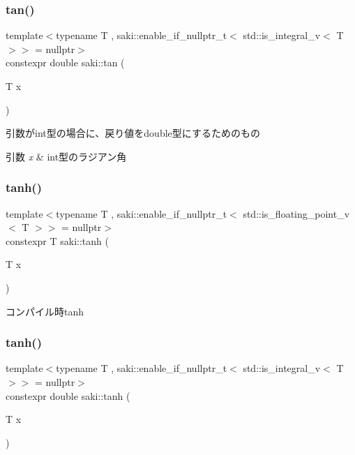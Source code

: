 \subsubsection{\texorpdfstring{tan()}{tan()}\hspace{0.1cm}{\footnotesize\ttfamily [2/2]}}
{\footnotesize\ttfamily template$<$typename T , saki\+::enable\+\_\+if\+\_\+nullptr\+\_\+t$<$ std\+::is\+\_\+integral\+\_\+v$<$ T $>$$>$  = nullptr$>$ \\
constexpr double saki\+::tan (\begin{DoxyParamCaption}\item[{T}]{x }\end{DoxyParamCaption})}



引数がint型の場合に、戻り値をdouble型にするためのもの 


\begin{DoxyParams}{引数}
{\em x} & int型のラジアン角 \\
\hline
\end{DoxyParams}
\mbox{\label{namespacesaki_af2674216630169ce211f8076492ce14e}} 
\subsubsection{\texorpdfstring{tanh()}{tanh()}\hspace{0.1cm}{\footnotesize\ttfamily [1/2]}}
{\footnotesize\ttfamily template$<$typename T , saki\+::enable\+\_\+if\+\_\+nullptr\+\_\+t$<$ std\+::is\+\_\+floating\+\_\+point\+\_\+v$<$ T $>$$>$  = nullptr$>$ \\
constexpr T saki\+::tanh (\begin{DoxyParamCaption}\item[{T}]{x }\end{DoxyParamCaption})}



コンパイル時tanh 

\mbox{\label{namespacesaki_a5faf83bc9a4a7e981275deba551d2f3f}} 
\subsubsection{\texorpdfstring{tanh()}{tanh()}\hspace{0.1cm}{\footnotesize\ttfamily [2/2]}}
{\footnotesize\ttfamily template$<$typename T , saki\+::enable\+\_\+if\+\_\+nullptr\+\_\+t$<$ std\+::is\+\_\+integral\+\_\+v$<$ T $>$$>$  = nullptr$>$ \\
constexpr double saki\+::tanh (\begin{DoxyParamCaption}\item[{T}]{x }\end{DoxyParamCaption})}



